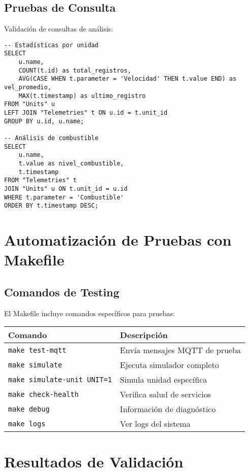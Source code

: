 \subsection{Pruebas de Consulta}

Validación de consultas de análisis:

\begin{verbatim}
-- Estadísticas por unidad
SELECT 
    u.name,
    COUNT(t.id) as total_registros,
    AVG(CASE WHEN t.parameter = 'Velocidad' THEN t.value END) as vel_promedio,
    MAX(t.timestamp) as ultimo_registro
FROM "Units" u
LEFT JOIN "Telemetries" t ON u.id = t.unit_id
GROUP BY u.id, u.name;

-- Análisis de combustible
SELECT 
    u.name,
    t.value as nivel_combustible,
    t.timestamp
FROM "Telemetries" t
JOIN "Units" u ON t.unit_id = u.id
WHERE t.parameter = 'Combustible'
ORDER BY t.timestamp DESC;
\end{verbatim}

\section{Automatización de Pruebas con Makefile}

\subsection{Comandos de Testing}

El Makefile incluye comandos específicos para pruebas:

\begin{table}[H]
\centering
\begin{tabular}{|l|l|}
\hline
\textbf{Comando} & \textbf{Descripción} \\
\hline
\texttt{make test-mqtt} & Envía mensajes MQTT de prueba \\
\hline
\texttt{make simulate} & Ejecuta simulador completo \\
\hline
\texttt{make simulate-unit UNIT=1} & Simula unidad específica \\
\hline
\texttt{make check-health} & Verifica salud de servicios \\
\hline
\texttt{make debug} & Información de diagnóstico \\
\hline
\texttt{make logs} & Ver logs del sistema \\
\hline
\end{tabular}
\end{table}

\section{Resultados de Validación}

